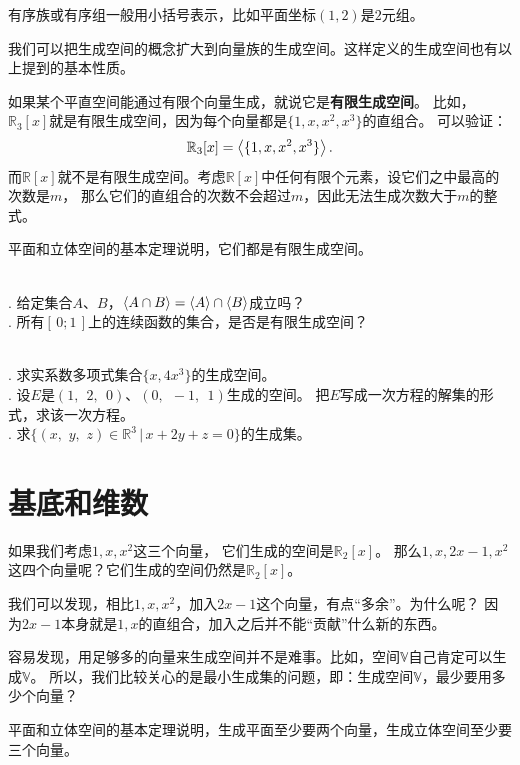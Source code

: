 \documentclass[12pt,UTF8,fontset=none]{ctexbook}
\begin{document}
有序族或有序组一般用小括号表示，比如平面坐标$(1,2)$是$2$元组。

我们可以把生成空间的概念扩大到向量族的生成空间。这样定义的生成空间也有以上提到的基本性质。

如果某个平直空间能通过有限个向量生成，就说它是\textbf{有限生成空间}。
比如，$\mathbb{R}_3[x]$就是有限生成空间，因为每个向量都是$\{1, x, x^2, x^3\}$的直组合。
可以验证：
$$\mathbb{R}_3[x] = \left\langle \{1, x, x^2, x^3\} \right\rangle.$$
而$\mathbb{R}[x]$就不是有限生成空间。考虑$\mathbb{R}[x]$中任何有限个元素，设它们之中最高的次数是$m$，
那么它们的直组合的次数不会超过$m$，因此无法生成次数大于$m$的整式。

平面和立体空间的基本定理说明，它们都是有限生成空间。

\begin{sk}
    \mbox{} \\
    . 给定集合$A$、$B$，$\left\langle A\cap B \right\rangle = \left\langle A \right\rangle\cap\left\langle B \right\rangle$成立吗？\\
    . 所有$[\,0;1\,]$上的连续函数的集合，是否是有限生成空间？
\end{sk}

\begin{xt}
    \mbox{} \\
    . 求实系数多项式集合$\{x, 4x^3\}$的生成空间。\\
    . 设$E$是$(1, \;\,2, \;\,0)$、$(0, \;\,-1, \;\,1)$生成的空间。
    把$E$写成一次方程的解集的形式，求该一次方程。\\
    . 求$\{(x,\,\,y,\,\,z)\in\mathbb{R}^3 \, | \, x + 2y + z = 0 \}$的生成集。
    
\end{xt}

\section{基底和维数}

如果我们考虑$1,x,x^2$这三个向量，
它们生成的空间是$\mathbb{R}_2[x]$。
那么$1,x,2x-1,x^2$这四个向量呢？它们生成的空间仍然是$\mathbb{R}_2[x]$。

我们可以发现，相比$1,x,x^2$，加入$2x-1$这个向量，有点“多余”。为什么呢？
因为$2x-1$本身就是$1, x$的直组合，加入之后并不能“贡献”什么新的东西。

容易发现，用足够多的向量来生成空间并不是难事。比如，空间$\mathbb{V}$自己肯定可以生成$\mathbb{V}$。
所以，我们比较关心的是最小生成集的问题，即：生成空间$\mathbb{V}$，最少要用多少个向量？

平面和立体空间的基本定理说明，生成平面至少要两个向量，生成立体空间至少要三个向量。
\end{document}
